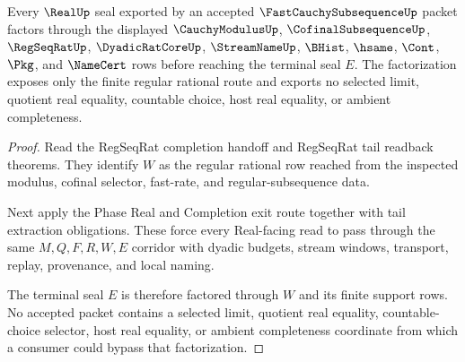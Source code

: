 \begin{theorem}
\label{thm:fast-cauchy-subsequence-real-seal-factorization}
Every $\RealUp$ seal exported by an accepted $\FastCauchySubsequenceUp$ packet factors through the displayed $\CauchyModulusUp$, $\CofinalSubsequenceUp$, $\RegSeqRatUp$, $\DyadicRatCoreUp$, $\StreamNameUp$, $\BHist$, $\hsame$, $\Cont$, $\Pkg$, and $\NameCert$ rows before reaching the terminal seal $E$. The factorization exposes only the finite regular rational route and exports no selected limit, quotient real equality, countable choice, host real equality, or ambient completeness.
\end{theorem}
\begin{proof}
Read the RegSeqRat completion handoff and RegSeqRat tail readback theorems. They identify $W$ as the regular rational row reached from the inspected modulus, cofinal selector, fast-rate, and regular-subsequence data.

Next apply the Phase Real and Completion exit route together with tail extraction obligations. These force every Real-facing read to pass through the same $M,Q,F,R,W,E$ corridor with dyadic budgets, stream windows, transport, replay, provenance, and local naming.

The terminal seal $E$ is therefore factored through $W$ and its finite support rows. No accepted packet contains a selected limit, quotient real equality, countable-choice selector, host real equality, or ambient completeness coordinate from which a consumer could bypass that factorization.
\end{proof}

